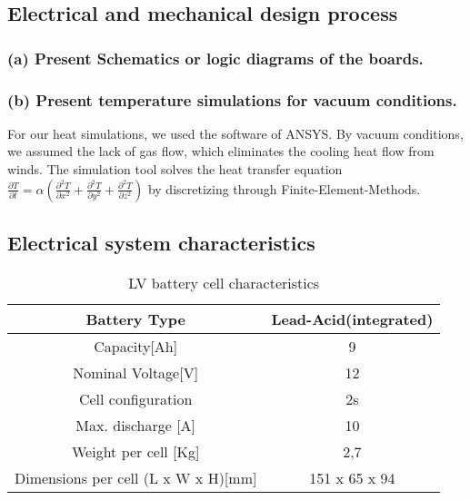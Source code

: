 \subsection{Electrical and mechanical design process}
\subsubsection{(a) Present Schematics or logic diagrams of the boards.}
\subsubsection{(b) Present temperature simulations for vacuum conditions.}
For our heat simulations, we used the software of ANSYS. By vacuum conditions, we assumed the
lack of gas flow, which eliminates the cooling heat flow from winds. The simulation tool solves
the heat transfer equation \( \frac{\partial T}{\partial t} = \alpha \left( \frac{\partial^2 T}{\partial x^2} + \frac{\partial^2 T}{\partial y^2} + \frac{\partial^2 T}{\partial z^2} \right) \)
by discretizing through Finite-Element-Methods.

\subsection{Electrical system characteristics}
\begin{table}
    \centering
    \begin{adjustbox}{width=\textwidth,center}
    \begin{tabular}{|c|c|}
       \hline
       Battery Type & Lead-Acid(integrated)\\
       \hline
       Capacity[Ah] & 9 \\
       \hline
       Nominal Voltage[V] & 12 \\
       \hline
       Cell configuration & 2s \\
       \hline
       Max. discharge [A] & 10 \\
       \hline
       Weight per cell [Kg] & 2,7 \\
       \hline 
       Dimensions per cell (L x W x H)[mm] & 151 x 65 x 94 \\
       \hline 
    \end{tabular}
    \end{adjustbox}
    \label{Low Voltage Cell Specs}
    \caption{LV battery cell characteristics}
\end{table}    

